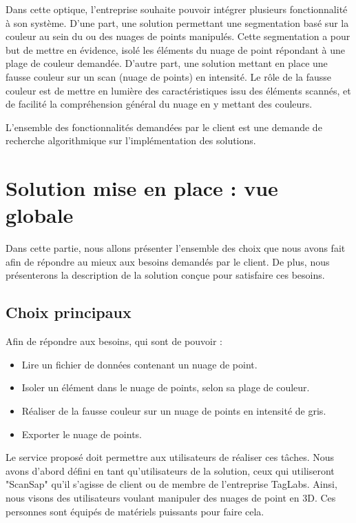\documentclass[12pt,titlepage,french]{article}
\begin{document}
Dans cette optique, l'entreprise souhaite pouvoir intégrer plusieurs fonctionnalité à son système. D'une part, une solution permettant une segmentation basé sur la couleur au sein du ou des nuages de points manipulés. Cette segmentation a pour but de mettre en évidence, isolé les éléments du nuage de point répondant à une plage de couleur demandée. D'autre part, une solution mettant en place une fausse couleur sur un scan (nuage de points) en intensité. Le rôle de la fausse couleur est de mettre en lumière des caractéristiques issu des éléments scannés, et de facilité la compréhension général du nuage en y mettant des couleurs. \newline

L'ensemble des fonctionnalités demandées par le client est une demande de recherche algorithmique sur l'implémentation des solutions.

\newpage
\section{Solution mise en place : vue globale}

Dans cette partie, nous allons présenter l'ensemble des choix que nous avons fait afin de répondre au mieux aux besoins demandés par le client. De plus, nous présenterons la description de la solution conçue pour satisfaire ces besoins.

\subsection{Choix principaux}

Afin de répondre aux besoins, qui sont de pouvoir :
\begin{itemize}
    \item Lire un fichier de données contenant un nuage de point.
    \item Isoler un élément dans le nuage de points, selon sa plage de couleur.
    \item Réaliser de la fausse couleur sur un nuage de points en intensité de gris.
    \item Exporter le nuage de points. \newline
\end{itemize}

Le service proposé doit permettre aux utilisateurs de réaliser ces tâches. Nous avons d'abord défini en tant qu'utilisateurs de la solution, ceux qui utiliseront "ScanSap" qu'il s'agisse de client ou de membre de l'entreprise TagLabs. Ainsi, nous visons des utilisateurs voulant manipuler des nuages de point en 3D. Ces personnes sont équipés de matériels puissants pour faire cela.\newline
\end{document}
